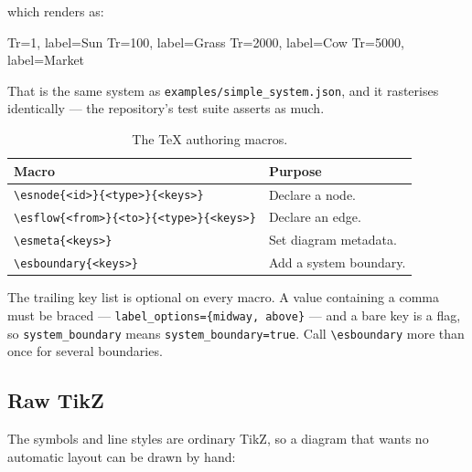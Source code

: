 \documentclass{article}
\begin{document}
\noindent which renders as:

\begin{center}
\begin{energese}[scale=0.75]

             {Tr=1,    label={Sun}}
         {Tr=100,  label={Grass}}
           {Tr=2000, label={Cow}}
     {Tr=5000, label={Market}}

\end{energese}
\end{center}

\noindent That is the same system as \texttt{examples/simple\_system.json}, and
it rasterises identically --- the repository's test suite asserts as much.

\begin{table}[h]
\centering
\begin{tabular}{ll}
\toprule
Macro & Purpose \\
\midrule
\verb|\esnode{<id>}{<type>}{<keys>}|         & Declare a node. \\
\verb|\esflow{<from>}{<to>}{<type>}{<keys>}| & Declare an edge. \\
\verb|\esmeta{<keys>}|                       & Set diagram metadata. \\
\verb|\esboundary{<keys>}|                   & Add a system boundary. \\
\bottomrule
\end{tabular}
\caption{The \TeX{} authoring macros.}
\end{table}

The trailing key list is optional on every macro. A value containing a comma
must be braced --- \verb|label_options={midway, above}| --- and a bare key is a
flag, so \verb|system_boundary| means \verb|system_boundary=true|. Call
\verb|\esboundary| more than once for several boundaries.

\subsection{Raw TikZ}

The symbols and line styles are ordinary TikZ, so a diagram that wants no
automatic layout can be drawn by hand:
\end{document}
